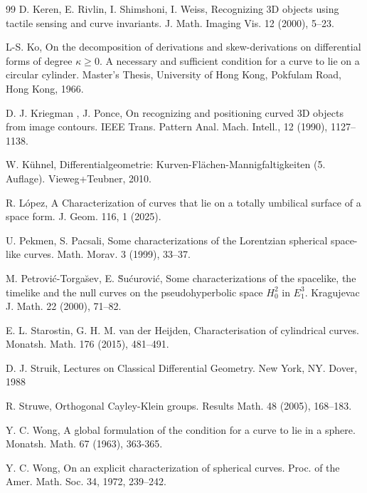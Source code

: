 \documentclass[a4paper,12pt]{amsart}
\theoremstyle{plain}
\theoremstyle{definition}
\begin{document}
\begin{thebibliography}{99}
  D. Keren, E.  Rivlin, I.  Shimshoni, I.  Weiss,  Recognizing 3D objects using tactile sensing and curve invariants. J. Math. Imaging Vis. 12 (2000), 5--23.

   L-S. Ko,   On the decomposition of derivations and skew-derivations on differential forms of degree $\kappa\geq 0$. A necessary and sufficient condition for a curve to lie on a circular cylinder. Master’s Thesis, University of Hong Kong, Pokfulam Road, Hong Kong, 1966.
 
  D. J. Kriegman , J.   Ponce, On recognizing and positioning curved 3D objects from image contours. IEEE Trans. Pattern Anal. Mach. Intell., 12  (1990), 1127--1138.

 W. K\"{u}hnel,  Differentialgeometrie: Kurven-Fl\"{a}chen-Mannigfaltigkeiten (5. Auflage). Vieweg+Teubner, 2010.
 
 R. L\'opez,   A Characterization of curves that lie on a totally umbilical surface of a space form. J. Geom. 116, 1 (2025).

 U. Pekmen, S. Pacsali,   Some characterizations of  the Lorentzian spherical space-like curves. Math. Morav. 3  (1999), 33--37.

M. Petrovi\'c-Torga\u{s}ev, E.  \u{S}u\'curovi\'c,  Some characterizations of the spacelike, the timelike and the null curves on the pseudohyperbolic space $H_0^2$ in $E_1^3$.  Kragujevac J. Math. 22  (2000), 71--82.



 E. L. Starostin, G. H. M.  van der Heijden,  Characterisation of cylindrical curves. Monatsh. Math. 176 (2015), 481--491.

   D. J. Struik,   Lectures on Classical Differential Geometry. New York, NY. Dover, 1988



 R. Struwe,  Orthogonal Cayley-Klein groups. Results Math. 48 (2005), 168--183.


 Y. C. Wong, A global formulation of the condition for a curve to lie in a sphere. Monatsh. Math. 67 (1963), 363-365. 


 Y. C. Wong, On an explicit characterization of spherical curves. Proc. of the Amer. Math. Soc. 34, 1972, 239–242.

\end{thebibliography}
\end{document}
